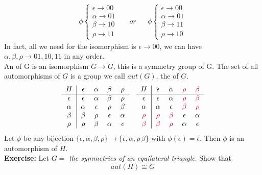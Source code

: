 \documentclass[openany]{report}
\begin{document}
\begin{align*}
    \phi \begin{cases}
    \epsilon \rightarrow 00\\
    \alpha \rightarrow 01\\
    \beta \rightarrow 10\\
    \rho \rightarrow 11
\end{cases} && or && 
\phi \begin{cases}
    \epsilon \rightarrow 00\\
    \alpha \rightarrow 01\\
    \beta \rightarrow 11\\
    \rho \rightarrow 10
\end{cases}
\end{align*}
In fact, all we need for the isomorphism is $\epsilon \rightarrow 00$, we can have $\alpha,\beta,\rho \rightarrow 01,10,11$ in any order.\\[3ex]
An  of G is an isomorphism $G \rightarrow G$, this is a symmetry group of G. The set of all automorphisms of $G$ is a group we call $aut(G)$, the  of $G$.
\begin{align*}
    \begin{tabular}{c|cccc}
     $H$& $\epsilon$ & $\alpha$ & $\beta$ &$\rho$  \\
     \hline
     $\epsilon$ & $\epsilon$ & $\alpha$ & $\beta$ & $\rho$\\
     $\alpha$ & $\alpha$ & $\epsilon$ & $\rho$ & $\beta $\\
     $\beta$ & $\beta$ & $\rho$ & $\epsilon$ & $\alpha$\\
     $\rho$ & $\rho$ & $\beta$ & $\alpha$ & $\epsilon$  
\end{tabular} &&
\begin{tabular}{c|cccc}
     $H$& $\epsilon$ & $\alpha$ & $\purple{\rho}$ &$\purple{\beta}$  \\
     \hline
     $\epsilon$ & $\epsilon$ & $\alpha$ & $\purple{\rho}$ & $\purple{\beta}$\\
     $\alpha$ & $\alpha$ & $\epsilon$ & $\purple{\beta}$ & $\purple{\rho} $\\
     $\purple{\rho}$ & $\purple{\rho}$ & $\purple{\beta}$ & $\epsilon$ & $\alpha$\\
     $\purple{\beta}$ & $\purple{\beta}$ & $\purple{\rho}$ & $\alpha$ & $\epsilon$  
\end{tabular}
\end{align*}
Let $\phi$ be any bijection $\{\epsilon, \alpha, \beta, \rho\} \rightarrow \{\epsilon, \alpha, \rho\, \beta \}$ with $\phi(\epsilon) = \epsilon$. Then $\phi$ is an automorphism of $H$.\\[2ex]
\textbf{Exercise:} Let $G =$ \textit{the symmetries of an equilateral triangle}. Show that 
$$aut(H) \cong G$$
\end{document}
